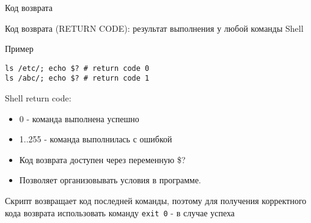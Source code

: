 \begin{frame}[fragile]{Код возврата}

  \Large{\alert{Код возврата (RETURN CODE)}}: \newline 
  \normalsize{результат выполнения у любой команды Shell}
  \newline
	\begin{block}{Пример}
		\begin{lstlisting}
ls /etc/; echo $? # return code 0
ls /abc/; echo $? # return code 1
\end{lstlisting}
	\end{block}

	\pause
  Shell return code:
  \begin{itemize}
    \item \alert{0} - команда выполнена успешно
    \item \alert{1..255} - команда выполнилась с ошибкой
    \item Код возврата доступен через переменную \alert{\$?}
    \item Позволяет организовывать условия в программе.
  \end{itemize}

	Скрипт возвращает код последней команды, поэтому для получения корректного кода возврата использовать команду {\tt exit 0} - в случае успеха

\end{frame}
